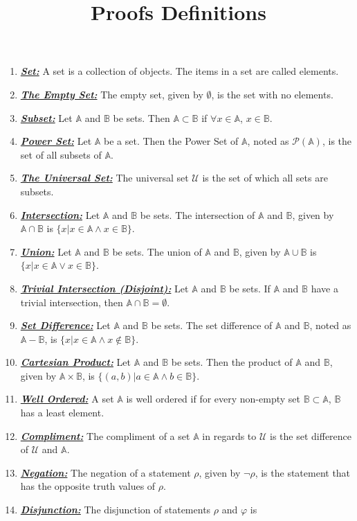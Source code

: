 \documentclass{article}
\title{Proofs Definitions}
\date{}
\newcommand{\deff}[1]{\textbf{\textit{\underline{#1}}}}
\newcommand{\PS}{\mathcal{P}}
\newcommand{\US}{\mathcal{U}}
\newcommand{\seta}{\mathbb{A}}
\newcommand{\setb}{\mathbb{B}}
\begin{document}
\maketitle
\begin{enumerate}
\item \deff{Set:} A set is a collection of objects.
The items in a set are called elements.
\item \deff{The Empty Set:} The empty set, given by $\emptyset$, is the set with
no elements.
\item \deff{Subset:} Let $\seta$ and $\setb$ be sets. Then $\seta\subset\setb$ if
$\forall x\in\seta$, $x\in\setb$.
\item \deff{Power Set:} Let $\seta$ be a set. Then the Power Set of $\seta$,
noted as $\PS(\seta)$, is the set of all subsets of $\seta$.
\item \deff{The Universal Set:} The universal set $\US$ is the set of which all
sets are subsets.
\item \deff{Intersection:} Let $\seta$ and $\setb$ be sets. The intersection of
$\seta$ and $\setb$, given by $\seta\cap\setb$ is
$\{x|x\in\seta\land x\in\setb\}$.
\item \deff{Union:} Let $\seta$ and $\setb$ be sets. The union of
$\seta$ and $\setb$, given by $\seta\cup\setb$ is
$\{x|x\in\seta\lor x\in\setb\}$.
\item \deff{Trivial Intersection (Disjoint):} Let $\seta$ and $\setb$ be sets. If $\seta$
and $\setb$ have a trivial intersection, then $\seta\cap\setb = \emptyset$.
\item \deff{Set Difference:} Let $\seta$ and $\setb$ be sets. The set difference
of $\seta$ and $\setb$, noted as $\seta - \setb$, is
$\{x|x\in\seta\land x\notin\setb\}$.
\item \deff{Cartesian Product:} Let $\seta$ and $\setb$ be sets. Then the product
of $\seta$ and $\setb$, given by $\seta\times\setb$, is
$\{(a,b)|a\in\seta\land b\in\setb\}$.
\item \deff{Well Ordered:} A set $\seta$ is well ordered if for every non-empty
set $\setb\subset\seta$, $\setb$ has a least element.
\item \deff{Compliment:} The compliment of a set $\seta$ in regards to $\US$ is
the set difference of $\US$ and $\seta$.
\item \deff{Negation:} The negation of a statement $\rho$, given by $\neg\rho$,
is the statement that has the opposite truth values of $\rho$.
\item \deff{Disjunction:} The disjunction of statements $\rho$ and $\varphi$ is

\end{enumerate}
\end{document}
